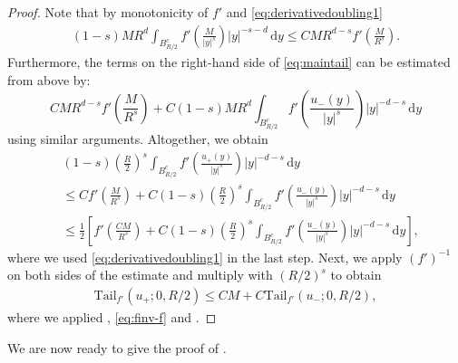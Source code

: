 \documentclass[11pt]{amsart}
\theoremstyle{plain}
\theoremstyle{definition}
\numberwithin{equation}{section}
\newcommand{\dy} {\,\mathrm{d}y}
\begin{document}
\begin{proof}
Note that by monotonicity of $f'$ and \eqref{eq:derivativedoubling1}
\begin{align*}
(1-s) M R^d \int_{B_{R/2}^{c}} f' \left( \frac{M}{\vert y \vert^s} \right)\vert y \vert^{-s-d} \dy \le C M R^{d-s} f' \left( \frac{M}{R^s} \right).
\end{align*}
Furthermore, the terms on the right-hand side of \eqref{eq:maintail} can be estimated from above by:
\begin{equation*}
C M R^{d-s} f' \left( \frac{M}{R^s} \right) + C(1-s) M R^d \int_{B_{R/2}^c} f' \left( \frac{u_-(y)}{|y|^s}  \right) |y|^{-d-s} \dy
\end{equation*}
using similar arguments. Altogether, we obtain
\begin{align*}
&(1-s) \left( \frac{R}{2} \right)^s \int_{B_{R/2}^{c}} f' \left( \frac{u_+(y)}{\vert y \vert^s} \right) |y|^{-d-s} \dy \\
&\le C f' \left( \frac{M}{R^s} \right) + C(1-s) \left( \frac{R}{2} \right)^s \int_{B_{R/2}^c} f' \left( \frac{u_-(y)}{|y|^s}  \right) |y|^{-d-s} \dy \\
&\le \frac{1}{2} \left[ f' \left( \frac{CM}{R^s} \right) + C(1-s) \left( \frac{R}{2} \right)^s \int_{B_{R/2}^c} f' \left( \frac{u_-(y)}{|y|^s}  \right) |y|^{-d-s} \dy \right],
\end{align*}
where we used \eqref{eq:derivativedoubling1} in the last step. Next, we apply $(f')^{-1}$ on both sides of the estimate and multiply with $(R/2)^s$ to obtain
\begin{align*}
\mathrm{Tail}_{f'}(u_+;0,R/2) \le C M + C \mathrm{Tail}_{f'}(u_-;0,R/2),
\end{align*}
where we applied , \eqref{eq:finv-f} and .
\end{proof}

We are now ready to give the proof of .
\end{document}
